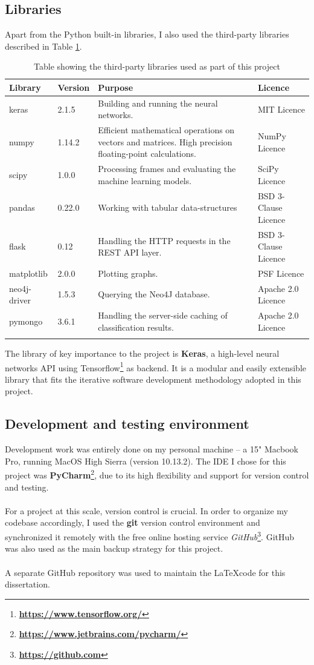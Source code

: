 	\subsection{Libraries} \label{Section 2.5.2}
	Apart from the Python built-in libraries, I also used the third-party libraries described in Table \ref{Table 2.3}. 
	\begin{longtable}{|p{} p{} p{} p{}|}
		\textbf{Library} & \textbf{Version} & \textbf{Purpose} & \textbf{Licence}\\
		\hline
		keras & 2.1.5 & Building and running the neural networks. & MIT Licence \\
		numpy & 1.14.2 & Efficient mathematical operations on vectors and matrices. High precision floating-point calculations. & NumPy Licence\\
		scipy & 1.0.0 & Processing frames and evaluating the machine learning models. & SciPy Licence\\
		pandas & 0.22.0 & Working with tabular data-structures & BSD 3-Clause Licence\\
		flask & 0.12 & Handling the HTTP requests in the REST API layer. & BSD 3-Clause Licence\\
		matplotlib & 2.0.0 & Plotting graphs. & PSF Licence \\
		neo4j-driver & 1.5.3 & Querying the Neo4J database. & Apache 2.0 Licence\\
		pymongo & 3.6.1 & Handling the server-side caching of classification results. & Apache 2.0 Licence\\
		\hline
		\caption[Libaries table]{\centering Table showing the third-party libraries used  as part of this project}
		\label{Table 2.3}
	\end{longtable} 
	The library of key importance to the project is \textbf{Keras}, a high-level neural networks API using Tensorflow\footnote{\textbf{\url{https://www.tensorflow.org/}}} as backend. It is a modular and easily extensible library that fits the iterative software development methodology adopted in this project.
	\subsection{Development and testing environment}
	Development work was entirely done on my personal machine -- a 15" Macbook Pro, running MacOS High Sierra (version 10.13.2). The IDE I chose for this project was \textbf{PyCharm}\footnote{\textbf{\url{https://www.jetbrains.com/pycharm/}}}, due to its high flexibility and support for version control and testing.
	\\ \\
	For a project at this scale, version control is crucial. In order to organize my codebase accordingly, I used the \textbf{git} version control environment and synchronized it remotely with the free online hosting service \textit{GitHub}\footnote{\textbf{\url{https://github.com}}}. GitHub was also used as the main backup strategy for this project.
	\\ \\
	A separate GitHub repository was used to maintain the \LaTeX \space code for this dissertation. 
	
